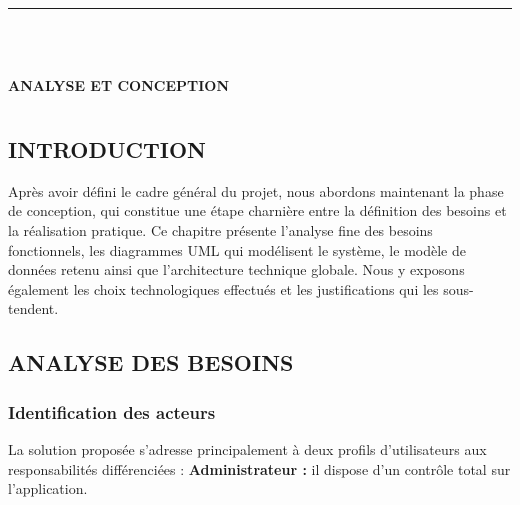 \documentclass[12pt, oneside, a4paper]{report}
\begin{document}
\noindent\rule[-0.2cm]{0.45cm}{1.2cm}\hspace{0.15cm}%
\raisebox{0.85cm}{\rule{0.85\textwidth}{0.5pt}}\\[0.3cm]
\noindent{}\\[1cm]

\begin{center}
    {\huge\textbf{ANALYSE ET CONCEPTION}}
\end{center}
\vspace{1cm}

\begingroup
\let\cleardoublepage\relax
\let\clearpage\relax
\chapter*{} %
\vspace{-3cm} %
\minitoc
\endgroup

\vspace{1.5cm}

\section{INTRODUCTION}
Après avoir défini le cadre général du projet, nous abordons maintenant la phase de conception, qui constitue une étape charnière entre la définition des besoins et la réalisation pratique. Ce chapitre présente l’analyse fine des besoins fonctionnels, les diagrammes UML qui modélisent le système, le modèle de données retenu ainsi que l’architecture technique globale. Nous y exposons également les choix technologiques effectués et les justifications qui les sous-tendent.

\section{ANALYSE DES BESOINS}

\subsection{Identification des acteurs}
La solution proposée s’adresse principalement à deux profils d’utilisateurs aux responsabilités différenciées :
\newpage
\vspace{1cm}
\textbf{Administrateur :} il dispose d’un contrôle total sur l’application.
\end{document}
